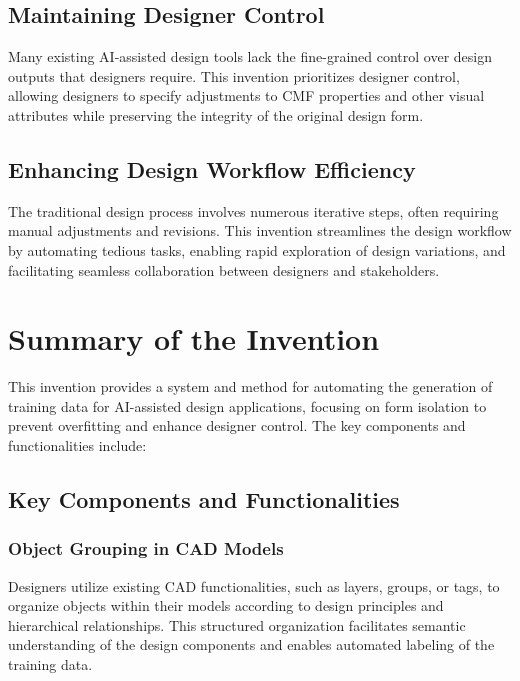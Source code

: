 \documentclass{article}
\begin{document}
\subsection{Maintaining Designer Control}
Many existing AI-assisted design tools lack the fine-grained control over design outputs that designers require. This invention prioritizes designer control, allowing designers to specify adjustments to CMF properties and other visual attributes while preserving the integrity of the original design form.

\subsection{Enhancing Design Workflow Efficiency}
The traditional design process involves numerous iterative steps, often requiring manual adjustments and revisions. This invention streamlines the design workflow by automating tedious tasks, enabling rapid exploration of design variations, and facilitating seamless collaboration between designers and stakeholders.


\section{Summary of the Invention}

This invention provides a system and method for automating the generation of training data for AI-assisted design applications, focusing on form isolation to prevent overfitting and enhance designer control. The key components and functionalities include:

\subsection{Key Components and Functionalities}

\subsubsection{Object Grouping in CAD Models}
Designers utilize existing CAD functionalities, such as layers, groups, or tags, to organize objects within their models according to design principles and hierarchical relationships. This structured organization facilitates semantic understanding of the design components and enables automated labeling of the training data.
\end{document}
